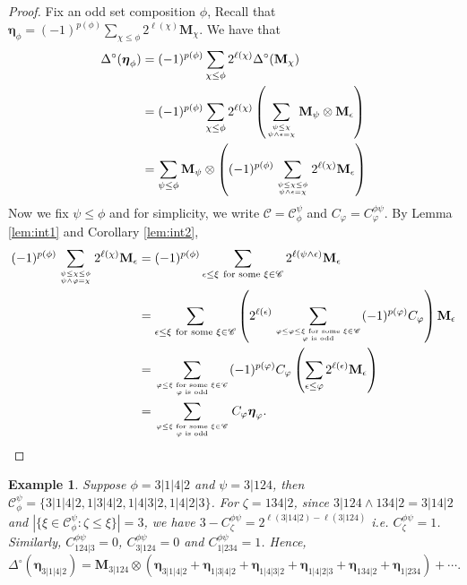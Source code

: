 \documentclass[11pt]{amsart}
\newtheorem{Example}[Theorem]{Example}
\numberwithin{equation}{section}
\newcommand{\boldeta}{{\boldsymbol{\eta}}}
\begin{document}
\begin{proof}
	Fix an odd set composition $\phi$, Recall that $\boldeta_\phi=(-1)^{p(\phi)}\sum_{\chi\leq\phi}2^{\ell(\chi)}\mathbf{M}_\chi$. We have that 
	\begin{align*}
		\Delta^\circ(\boldeta_\phi)&=(-1)^{p(\phi)}\sum_{\chi\leq\phi}2^{\ell(\chi)}\Delta^\circ(\mathbf{M}_\chi)\\
		&=(-1)^{p(\phi)}\sum_{\chi\leq\phi}2^{\ell(\chi)}\left(\sum_{\psi\leq\chi \atop \psi\land\epsilon=\chi}\mathbf{M}_\psi\otimes\mathbf{M}_\epsilon\right)\\
		&=\sum_{\psi\leq\phi}\mathbf{M}_{\psi}\otimes\left((-1)^{p(\phi)}\sum_{\psi\leq\chi\leq\phi \atop \psi\land\epsilon=\chi}2^{\ell(\chi)}\mathbf{M}_\epsilon\right)
	\end{align*}
	Now we fix $\psi\leq\phi$ and for simplicity, we write $\mathscr{C}=\mathscr{C}_\phi^\psi$ and $C_{\varphi}=C_{\varphi}^{\phi\psi}$. By Lemma \ref{lem:int1} and Corollary \ref{lem:int2},
	\begin{align*}
		(-1)^{p(\phi)}\sum_{\psi\leq\chi\leq\phi \atop \psi\land\varphi=\chi}2^{\ell(\chi)}\mathbf{M}_\epsilon&=
		(-1)^{p(\phi)}\sum_{\epsilon\leq\xi ~\text{for some }\xi\in\mathscr{C}}2^{\ell(\psi\land\epsilon)}\mathbf{M}_\epsilon\\
		&=\sum_{\epsilon\leq\xi ~ \text{for some }\xi\in\mathscr{C}}\left(2^{\ell(\epsilon)}\sum_{\varphi\leq{\varphi}\leq\xi\text{ for some }\xi\in\mathscr{C} \atop {\varphi}\text{ is odd}}(-1)^{p({\varphi})}C_{\varphi}\right)\mathbf{M}_\epsilon\\
		&=\sum_{{\varphi}\leq\xi\text{ for some }\xi\in\mathscr{C} \atop {\varphi}\text{ is odd}}(-1)^{p(\varphi)}C_{\varphi}\left(\sum_{\epsilon\leq{\varphi}}2^{\ell(\epsilon)}\mathbf{M}_\epsilon\right)\\
		&=\sum_{{\varphi}\leq\xi\text{ for some }\xi\in\mathscr{C} \atop {\varphi}\text{ is odd}}C_{\varphi}\boldeta_{\varphi}.
	\end{align*}
\end{proof}

\begin{Example}
	Suppose $\phi=3|1|4|2$ and $\psi=3|124$, then $\mathscr{C}_\phi^\psi=\{3|1|4|2,1|3|4|2,1|4|3|2,1|4|2|3\}$. For $\zeta=134|2$, since $3|124\land 134|2=3|14|2$ and $|\{\xi\in\mathscr{C}_\phi^\psi:\zeta\leq\xi\}|=3$, we have $3-C_\zeta^{\phi\psi}=2^{\ell(3|14|2)-\ell(3|124)}$ i.e. $C_\zeta^{\phi\psi}=1$. Similarly, $C_{124|3}^{\phi\psi}=0$, $C_{3|124}^{\phi\psi}=0$ and $C_{1|234}^{\phi\psi}=1$. Hence,
	$$\Delta^\circ(\boldeta_{3|1|4|2})=\mathbf{M}_{3|124}\otimes(\boldeta_{3|1|4|2}+\boldeta_{1|3|4|2}+\boldeta_{1|4|3|2}+\boldeta_{1|4|2|3}+\boldeta_{134|2}+\boldeta_{1|234})+\cdots.$$
\end{Example}
\end{document}
